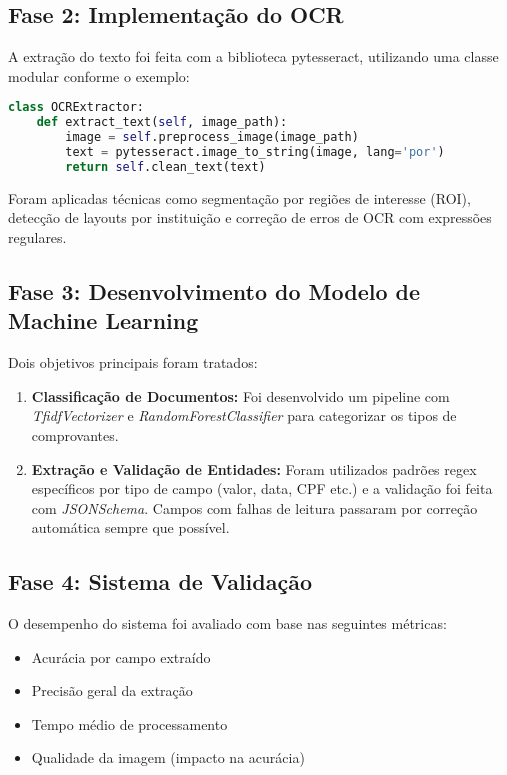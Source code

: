 \subsection{Fase 2: Implementação do OCR}

A extração do texto foi feita com a biblioteca pytesseract, utilizando uma classe modular conforme o exemplo:

\begin{lstlisting}[language=Python]
class OCRExtractor:
    def extract_text(self, image_path):
        image = self.preprocess_image(image_path)
        text = pytesseract.image_to_string(image, lang='por')
        return self.clean_text(text)
\end{lstlisting}

Foram aplicadas técnicas como segmentação por regiões de interesse (ROI), detecção de layouts por instituição e correção de erros de OCR com expressões regulares.

\subsection{Fase 3: Desenvolvimento do Modelo de Machine Learning}

Dois objetivos principais foram tratados:

\begin{enumerate}[label=\alph*)]
    \item \textbf{Classificação de Documentos:} Foi desenvolvido um pipeline com \textit{TfidfVectorizer} e \textit{RandomForestClassifier} para categorizar os tipos de comprovantes.
    \item \textbf{Extração e Validação de Entidades:} Foram utilizados padrões regex específicos por tipo de campo (valor, data, CPF etc.) e a validação foi feita com \textit{JSONSchema}. Campos com falhas de leitura passaram por correção automática sempre que possível.
\end{enumerate}

\subsection{Fase 4: Sistema de Validação}

O desempenho do sistema foi avaliado com base nas seguintes métricas:

\begin{itemize}
    \item Acurácia por campo extraído
    \item Precisão geral da extração
    \item Tempo médio de processamento
    \item Qualidade da imagem (impacto na acurácia)
\end{itemize}

